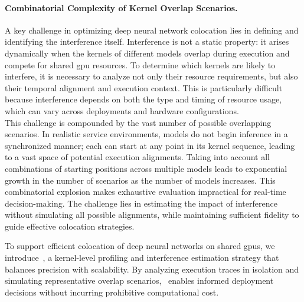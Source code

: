 \paragraph{Combinatorial Complexity of Kernel Overlap Scenarios.}
A key challenge in optimizing deep neural network colocation lies in defining and identifying the interference itself. Interference is not a static property: it arises dynamically when the kernels of different models overlap during execution and compete for shared \acrshort{gpu} resources. To determine which kernels are likely to interfere, it is necessary to analyze not only their resource requirements, but also their temporal alignment and execution context. This is particularly difficult because interference depends on both the type and timing of resource usage, which can vary across deployments and hardware configurations.\\
This challenge is compounded by the vast number of possible overlapping scenarios. In realistic service environments, models do not begin inference in a synchronized manner; each can start at any point in its kernel sequence, leading to a vast space of potential execution alignments. Taking into account all combinations of starting positions across multiple models leads to exponential growth in the number of scenarios as the number of models increases. This combinatorial explosion makes exhaustive evaluation impractical for real-time decision-making. The challenge lies in estimating the impact of interference without simulating all possible alignments, while maintaining sufficient fidelity to guide effective colocation strategies.

To support efficient colocation of deep neural networks on shared \acrshort{gpu}s, we introduce~\roomie, a kernel-level profiling and interference estimation strategy that balances precision with scalability. By analyzing execution traces in isolation and simulating representative overlap scenarios,~\roomie{} enables informed deployment decisions without incurring prohibitive computational cost.